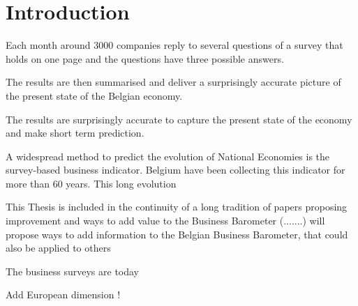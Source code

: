 \documentclass[12pt,a4paper,oneside]{book}
\begin{document}
\tableofcontents

\newpage
\setcounter{page}{0}


\chapter{Introduction}


Each month around 3000 companies reply to several questions of a survey that holds on one page and the questions have three possible answers.

The results are then summarised and deliver a surprisingly accurate picture of the present state of the Belgian economy.



The results are surprisingly accurate to capture the present state of the economy and make short term prediction.


A widespread method to predict the evolution of National Economies is the survey-based business indicator. Belgium have been collecting this indicator for more than 60 years. This long evolution 




This Thesis is included in the continuity of a long tradition of papers proposing improvement and ways to add value to the Business Barometer (.......) will propose ways to add information to the Belgian Business Barometer, that could also be applied to others

The business surveys are today 

Add European dimension !

\end{document}
